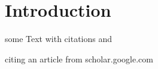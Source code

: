 \documentclass[12pt,a4paper]{article}
\begin{document}
\section{Introduction}

some Text with citations \cite{example} and \cite{example}

citing an article from scholar.google.com \cite{reilly2003science}


\newpage

\printbibliography
\end{document}
